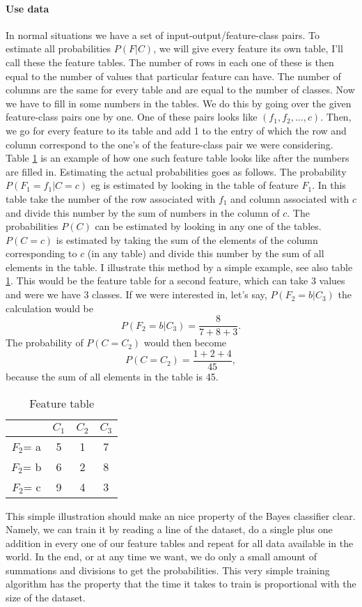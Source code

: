 \documentclass{report}
\theoremstyle{definition}
\begin{document}
\paragraph{Use data}
In normal situations we have a set of input-output/feature-class pairs. To estimate all probabilities $P(F|C)$, we will give every feature its own table, I'll call these the feature tables. The number of rows in each one of these is then equal to the number of values that particular feature can have. The number of columns are the same for every table and are equal to the number of classes. Now we have to fill in some numbers in the tables. We do this by going over the given feature-class pairs one by one. One of these pairs looks like $(f_1,f_2,...,c)$. Then, we go for every feature to its table and add 1 to the entry of which the row and column correspond to the one's of the feature-class pair we were considering. Table \ref{tabeltraining} is an example of how one such feature table looks like after the numbers are filled in. Estimating the actual probabilities goes as follows. The probability $P(F_1 = f_1 | C = c)$ eg is estimated by looking in the table of feature $F_1$. In this table take the number of the row associated with $f_1$ and column associated with $c$ and divide this number by the sum of numbers in the column of $c$. The probabilities $P(C)$ can be estimated by looking in any one of the tables. $P(C=c)$ is estimated by taking the sum of the elements of the column corresponding to $c$ (in any table) and divide this number by the sum of all elements in the table. I illustrate this method by a simple example, see also table \ref{tabeltraining}. This would be the feature table for a second feature, which can take 3 values and were we have 3 classes. If we were interested in, let's say, $P(F_2=b|C_3)$ the calculation would be
$$
P(F_2=b|C_3) = \frac{8}{7+8+3}.
$$
The probability of $P(C = C_2)$ would then become
$$
P(C = C_2) = \frac{1+2+4}{45},
$$
because the sum of all elements in the table is 45.
\begin{table} \label{tabeltraining}
\caption{Feature table}
\begin{center}
\begin{tabular}{c|c c c}
    	  & $C_1$ & $C_2$ & $C_3$\\  \hline
 $F_2$= a & 5     & 1 	  & 7 \\
 $F_2$= b & 6     & 2 	  & 8 \\
 $F_2$= c & 9     & 4 	  & 3 \\
 
\end{tabular}
\end{center}
\end{table} 
\newline
This simple illustration should make an nice property of the Bayes classifier clear. Namely, we can train it by reading a line of the dataset, do a single plus one addition in every one of our feature tables and repeat for all data available in the world. In the end, or at any time we want, we do only a small amount of summations and divisions to get the probabilities. This very simple training algorithm has the property that the time it takes to train is proportional with the size of the dataset.
\end{document}
